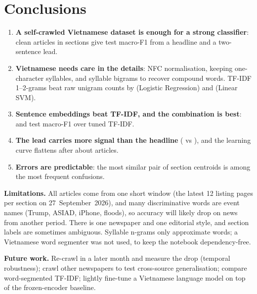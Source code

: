 \begin{table}[H]\centering\small
\caption{Predictions of the final model on new headlines.}\label{tx:tab-demo}

\end{table}

\section{Conclusions}\label{tx:conclusion}
\begin{enumerate}
\item \textbf{A self-crawled Vietnamese dataset is enough for a strong classifier}: \TXRowsClean{} clean articles in \TXClasses{}
sections give \TXFinF{} test macro-F1 from a headline and a two-sentence lead.
\item \textbf{Vietnamese needs care in the details}: NFC normalisation, keeping one-character syllables, and syllable bigrams to
recover compound words. TF-IDF 1–2-grams beat raw unigram counts by \TXGainBiOverBowLr{} (Logistic Regression) and
\TXGainBiOverBowSvm{} (Linear SVM).
\item \textbf{Sentence embeddings beat TF-IDF, and the combination is best}: \TXGainEmb{} and \TXGainHyb{} test macro-F1 over tuned TF-IDF.
\item \textbf{The lead carries more signal than the headline} (\TXLeadOnly{} vs \TXHeadOnly), and the learning curve flattens
after about \TXLcMidN{} articles.
\item \textbf{Errors are predictable}: the most similar pair of section centroids is among the most frequent confusions.
\end{enumerate}
\textbf{Limitations.} All articles come from one short window (the latest 12 listing pages per section on 27~September~2026),
and many discriminative words are event names (Trump, ASIAD, iPhone, floods), so accuracy will likely drop on news from
another period. There is one newspaper and one editorial style, and section labels are sometimes ambiguous. Syllable
n-grams only approximate words; a Vietnamese word segmenter was not used, to keep the notebook dependency-free.

\textbf{Future work.} Re-crawl in a later month and measure the drop (temporal robustness); crawl other newspapers to test
cross-source generalisation; compare word-segmented TF-IDF; lightly fine-tune a Vietnamese language model on top of the
frozen-encoder baseline.

